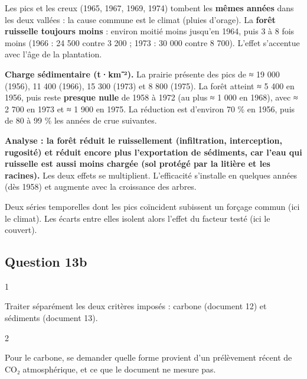 \documentclass[11pt,a4paper]{article}
\begin{document}
Les pics et les creux (1965, 1967, 1969, 1974) tombent les \textbf{mêmes années} dans les deux vallées : la cause commune est le climat (pluies d'orage). La \textbf{forêt ruisselle toujours moins} : environ moitié moins jusqu'en 1964, puis 3 à 8 fois moins (1966 : 24 500 contre 3 200 ; 1973 : 30 000 contre 8 700). L'effet s'accentue avec l'âge de la plantation.

\textbf{Charge sédimentaire (t·km⁻²).} La prairie présente des pics de ≈ 19 000 (1956), 11 400 (1966), 15 300 (1973) et 8 800 (1975). La forêt atteint ≈ 5 400 en 1956, puis reste \textbf{presque nulle} de 1958 à 1972 (au plus ≈ 1 000 en 1968), avec ≈ 2 700 en 1973 et ≈ 1 900 en 1975. La réduction est d'environ 70 \% en 1956, puis de 80 à 99 \% les années de crue suivantes.

\textbf{Analyse : la forêt réduit le ruissellement (infiltration, interception, rugosité) et réduit encore plus l'exportation de sédiments, car l'eau qui ruisselle est aussi moins chargée (sol protégé par la litière et les racines).} Les deux effets se multiplient. L'efficacité s'installe en quelques années (dès 1958) et augmente avec la croissance des arbres.

\begin{methode}

Deux séries temporelles dont les pics coïncident subissent un forçage commun (ici le climat). Les écarts entre elles isolent alors l'effet du facteur testé (ici le couvert).

\end{methode}

\hypertarget{question-13b}{%
\subsection{Question 13b}\label{question-13b}}

\begin{indication}{1}

Traiter séparément les deux critères imposés : carbone (document 12) et sédiments (document 13).

\end{indication}

\begin{indication}{2}

Pour le carbone, se demander quelle forme provient d'un prélèvement récent de CO₂ atmosphérique, et ce que le document ne mesure pas.

\end{indication}
\end{document}
